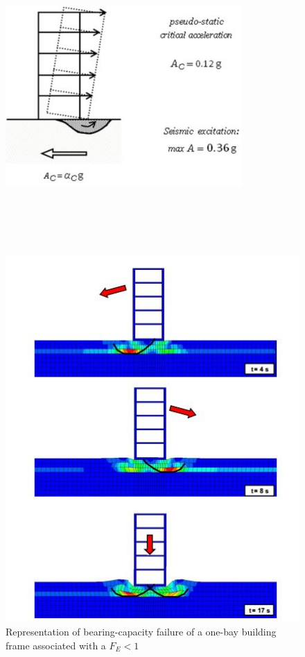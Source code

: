 \documentclass[12pt,a4paper]{report}
\begin{document}
   \begin{figure}[!h]
   	\centering
   	\begin{minipage}[b]{0.45\textwidth}
   		\includegraphics[width=9cm, height=12cm, keepaspectratio]{newmark5}
   		\caption{Representation of bearing-capacity failure of a one-bay building frame associated with a $F_E<1$}
   		\label{new5}
   	\end{minipage}
   	\hfill
   	\begin{minipage}[b]{0.45\textwidth}
   		\includegraphics[width=\textwidth]{newmark4}

\end{minipage}
\end{figure}
\end{document}
